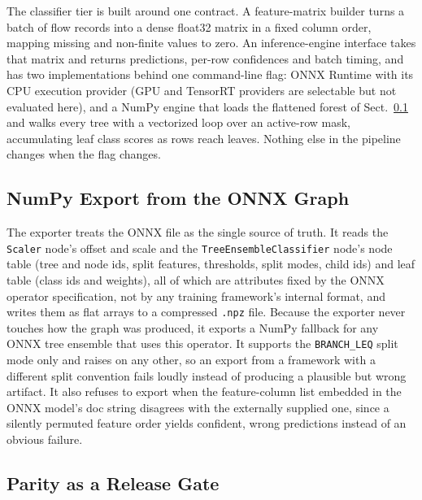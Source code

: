 \documentclass[runningheads]{llncs}
\begin{document}
The classifier tier is built around one contract. A feature-matrix builder turns a batch of flow records into a dense float32 matrix in a fixed column order, mapping missing and non-finite values to zero. An inference-engine interface takes that matrix and returns predictions, per-row confidences and batch timing, and has two implementations behind one command-line flag: ONNX Runtime with its CPU execution provider (GPU and TensorRT providers are selectable but not evaluated here), and a NumPy engine that loads the flattened forest of Sect.~\ref{sec:export} and walks every tree with a vectorized loop over an active-row mask, accumulating leaf class scores as rows reach leaves. Nothing else in the pipeline changes when the flag changes.

\subsection{NumPy Export from the ONNX Graph}
\label{sec:export}

The exporter treats the ONNX file as the single source of truth. It reads the \texttt{Scaler} node's offset and scale and the \texttt{TreeEnsembleClassifier} node's node table (tree and node ids, split features, thresholds, split modes, child ids) and leaf table (class ids and weights), all of which are attributes fixed by the ONNX operator specification, not by any training framework's internal format, and writes them as flat arrays to a compressed \texttt{.npz} file. Because the exporter never touches how the graph was produced, it exports a NumPy fallback for any ONNX tree ensemble that uses this operator. It supports the \texttt{BRANCH\_LEQ} split mode only and raises on any other, so an export from a framework with a different split convention fails loudly instead of producing a plausible but wrong artifact. It also refuses to export when the feature-column list embedded in the ONNX model's doc string disagrees with the externally supplied one, since a silently permuted feature order yields confident, wrong predictions instead of an obvious failure.

\subsection{Parity as a Release Gate}
\label{sec:parity}
\end{document}
